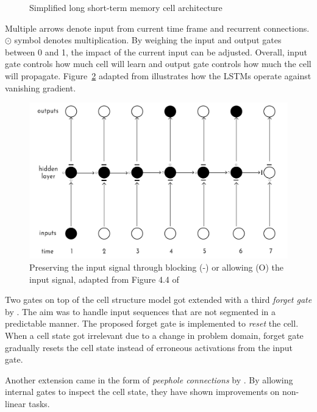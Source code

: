 \begin{figure}[htbp]
    \centering
    \caption{Simplified long short-term memory cell architecture}%
    \label{fig:simple_lstm}
\end{figure}

Multiple arrows denote input from current time frame and recurrent connections.
$\odot$ symbol denotes multiplication.
By weighing the input and output gates between 0 and 1, the impact of the current input can be adjusted.
Overall, input gate controls how much cell will learn and output gate controls how much the cell will propagate.
Figure~\ref{fig:lstm_preserves} adapted from \textcite{graves_long_2012} illustrates how the LSTMs operate against vanishing gradient.

\begin{figure}[htbp]
    \centering
    \includegraphics[page=1,width=\textwidth]{Figures/outputs_hiddenlayer2.pdf}
    \caption{Preserving the input signal through blocking (-) or allowing (O) the input signal, adapted from Figure 4.4 of \textcite{graves_long_2012}}%
    \label{fig:lstm_preserves}
\end{figure}

Two gates on top of the cell structure model got extended with a third \emph{forget gate} by \textcite{gers_learning_2000}.
The aim was to handle input sequences that are not segmented in a predictable manner.
The proposed forget gate is implemented to \emph{reset} the cell.
When a cell state got irrelevant due to a change in problem domain, forget gate gradually resets the cell state instead of erroneous activations from the input gate.

Another extension came in the form of \emph{peephole connections} by \textcite{gers_learning_2003}.
By allowing internal gates to inspect the cell state, they have shown improvements on non-linear tasks.

